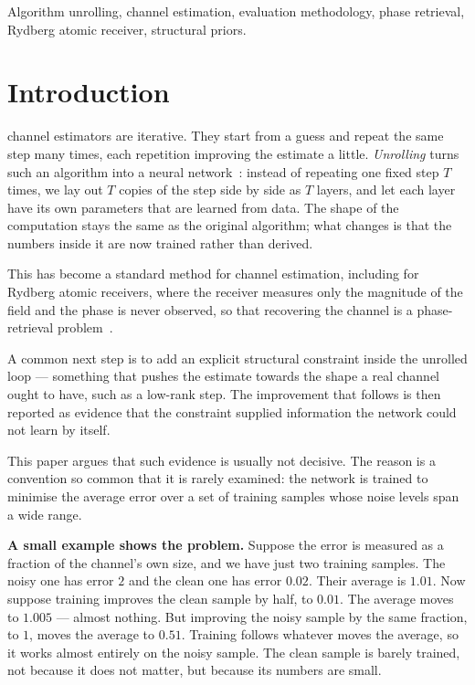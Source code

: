 \documentclass[journal]{IEEEtran}
\begin{document}
\begin{IEEEkeywords}
Algorithm unrolling, channel estimation, evaluation methodology, phase
retrieval, Rydberg atomic receiver, structural priors.
\end{IEEEkeywords}

\section{Introduction}

 channel estimators are iterative. They start from a guess
and repeat the same step many times, each repetition improving the estimate a
little. \emph{Unrolling} turns such an algorithm into a neural
network~\cite{gregor2010,monga2021}: instead of repeating one fixed step $T$
times, we lay out $T$ copies of the step side by side as $T$ layers, and let
each layer have its own parameters that are learned from data. The shape of the
computation stays the same as the original algorithm; what changes is that the
numbers inside it are now trained rather than derived.

This has become a standard method for channel estimation, including for Rydberg
atomic receivers, where the receiver measures only the magnitude of the field
and the phase is never observed, so that recovering the channel is a
phase-retrieval problem~\cite{xiao2026,cui2025}.

A common next step is to add an explicit structural constraint inside the
unrolled loop --- something that pushes the estimate towards the shape a real
channel ought to have, such as a low-rank step. The improvement that follows is
then reported as evidence that the constraint supplied information the network
could not learn by itself.

This paper argues that such evidence is usually not decisive. The reason is a
convention so common that it is rarely examined: the network is trained to
minimise the average error over a set of training samples whose noise levels
span a wide range.

\textbf{A small example shows the problem.} Suppose the error is measured as a
fraction of the channel's own size, and we have just two training samples. The
noisy one has error $2$ and the clean one has error $0.02$. Their average is
$1.01$. Now suppose training improves the clean sample by half, to $0.01$. The
average moves to $1.005$ --- almost nothing. But improving the noisy sample by
the same fraction, to $1$, moves the average to $0.51$. Training follows
whatever moves the average, so it works almost entirely on the noisy sample.
The clean sample is barely trained, not because it does not matter, but because
its numbers are small.
\end{document}
